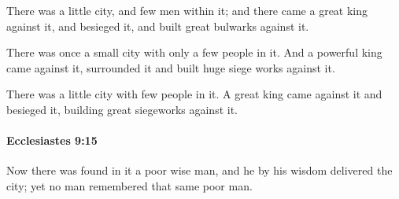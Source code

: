 			\begin{versebox}
					\item[BHS] 
					\item[LXX] 
					\item[ASV] There was a little city, and few men within it; and there came a great king against it, and besieged it, and built great bulwarks against it.
					\item[NIV] There was once a small city with only a few people in it. And a powerful king came against it, surrounded it and built huge siege works against it.
					\item[NRSV] There was a little city with few people in it. A great king came against it and besieged it, building great siegeworks against it.
			\end{versebox}

		\paragraph{Ecclesiastes 9:15} %
			\label{ECCLESIASTES-9-15}

			Now there was found in it a poor wise man, and he by his wisdom delivered the city; yet no man remembered that same poor man.

